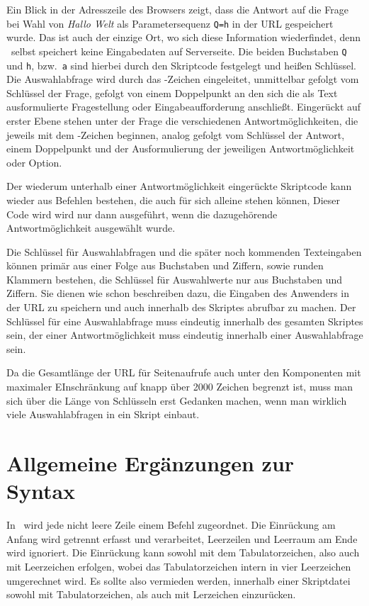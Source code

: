 Ein Blick in der Adresszeile des Browsers zeigt, dass die Antwort auf die Frage bei Wahl von \emph{Hallo Welt} als Parametersequenz \verb|Q=h| in der URL gespeichert wurde. Das ist auch der einzige Ort, wo sich diese Information wiederfindet, denn \FPZ\ selbst speichert keine Eingabedaten auf Serverseite. Die beiden Buchstaben \verb|Q| und \verb|h|, bzw.\ \verb|a| sind hierbei durch den Skriptcode festgelegt und heißen Schlüssel. 
Die Auswahlabfrage wird durch das -Zeichen eingeleitet, unmittelbar gefolgt vom Schlüssel der Frage, gefolgt von einem Doppelpunkt an den sich die als Text ausformulierte Fragestellung oder Eingabeaufforderung anschließt. Eingerückt auf erster Ebene stehen unter der Frage die verschiedenen Antwortmöglichkeiten, die jeweils mit dem \cidxfrag{\#}-Zeichen beginnen, analog gefolgt vom Schlüssel der Antwort, einem Doppelpunkt und der Ausformulierung der jeweiligen Antwortmöglichkeit oder Option. 

Der wiederum unterhalb einer Antwortmöglichkeit eingerückte Skriptcode kann wieder aus Befehlen bestehen, die auch für sich alleine stehen können, Dieser Code wird wird nur dann ausgeführt, wenn die dazugehörende Antwortmöglichkeit ausgewählt wurde.

Die Schlüssel für Auswahlabfragen und die später noch kommenden Texteingaben können primär aus einer Folge aus Buchstaben und Ziffern, sowie runden Klammern bestehen, die Schlüssel für Auswahlwerte nur aus Buchstaben und Ziffern. Sie dienen wie schon beschreiben dazu, die Eingaben des Anwenders in der URL zu speichern und auch innerhalb des Skriptes abrufbar zu machen. Der Schlüssel für eine Auswahlabfrage muss eindeutig innerhalb des gesamten Skriptes sein, der einer Antwortmöglichkeit muss eindeutig innerhalb einer Auswahlabfrage sein. 

Da die Gesamtlänge der URL für Seitenaufrufe auch unter den Komponenten mit maximaler EInschränkung auf knapp über 2000 Zeichen begrenzt ist, muss man sich über die Länge von Schlüsseln erst Gedanken machen, wenn man wirklich viele Auswahlabfragen in ein Skript einbaut.

\section{Allgemeine Ergänzungen zur Syntax}
In \FPZ\ wird jede nicht leere Zeile einem Befehl zugeordnet. Die Einrückung am Anfang wird getrennt erfasst und verarbeitet, Leerzeilen und Leerraum am Ende wird ignoriert. Die Einrückung kann sowohl mit dem Tabulatorzeichen, also auch mit Leerzeichen erfolgen, wobei das Tabulatorzeichen intern in vier Leerzeichen umgerechnet wird. Es sollte also vermieden werden, innerhalb einer Skriptdatei sowohl mit Tabulatorzeichen, als auch mit Lerzeichen einzurücken.

